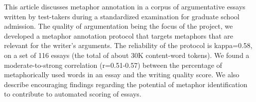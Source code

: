 This article discusses metaphor annotation in a corpus of argumentative essays written by test-takers during a standardized examination for graduate school
 admission. The quality of argumentation being the focus of the project, we
 developed a metaphor annotation protocol that targets metaphors that are
 relevant for the writer's arguments. The reliability of the protocol is
 kappa=0.58, on a set of 116 essays (the total of about 30K content-word
 tokens). We found a moderate-to-strong correlation (r=0.51-0.57) between the
 percentage of metaphorically used words in an essay and the writing quality
 score. We also describe encouraging findings regarding the potential of 
 metaphor identification to contribute to automated scoring of essays.


